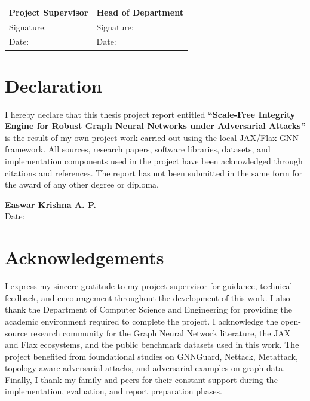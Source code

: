 \documentclass[12pt,oneside]{report}
\begin{document}
\vspace{0.6in}
\begin{tabular}{p{2.7in}p{2.7in}}
\textbf{Project Supervisor} & \textbf{Head of Department}\\
Signature: & Signature:\\
Date: & Date:
\end{tabular}

\chapter*{Declaration}
I hereby declare that this thesis project report entitled \textbf{``Scale-Free Integrity Engine for Robust Graph Neural Networks under Adversarial Attacks''} is the result of my own project work carried out using the local JAX/Flax GNN framework. All sources, research papers, software libraries, datasets, and implementation components used in the project have been acknowledged through citations and references. The report has not been submitted in the same form for the award of any other degree or diploma.

\vspace{0.6in}
\begin{flushright}
\textbf{Easwar Krishna A. P.}\\
Date:
\end{flushright}

\chapter*{Acknowledgements}
I express my sincere gratitude to my project supervisor for guidance, technical feedback, and encouragement throughout the development of this work. I also thank the Department of Computer Science and Engineering for providing the academic environment required to complete the project. I acknowledge the open-source research community for the Graph Neural Network literature, the JAX and Flax ecosystems, and the public benchmark datasets used in this work. The project benefited from foundational studies on GNNGuard, Nettack, Metattack, topology-aware adversarial attacks, and adversarial examples on graph data. Finally, I thank my family and peers for their constant support during the implementation, evaluation, and report preparation phases.
\end{document}
